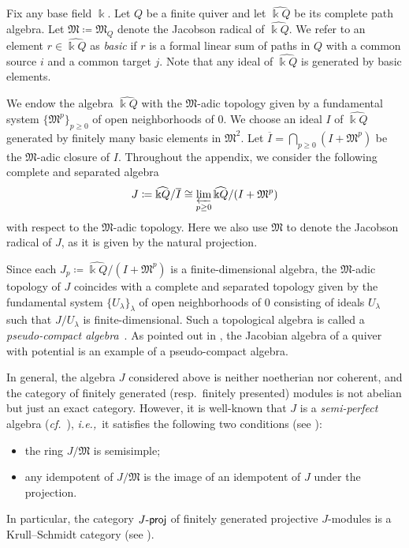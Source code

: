 \documentclass[12pt]{amsart}
\theoremstyle{definition}
\theoremstyle{remark}
\numberwithin{equation}{section}
\newcommand{\ie}{\textit{i.e.,}\ }
\newcommand{\confer}{\textit{cf.}\ }
\newcommand{\projc}{\mathchar`-\mathsf{proj}}
\newcommand{\fM}{\mathfrak{M}}
\begin{document}
Fix any base field $\Bbbk $. Let $Q$ be a finite quiver and let $\widehat{ \Bbbk  Q}$ be its complete path algebra. Let $\fM \coloneqq \mathfrak{M}_Q$ denote the Jacobson radical of $\widehat{ \Bbbk  Q}$.
We refer to an element $r\in \widehat{ \Bbbk  Q}$ as \emph{basic} if $r$ is a formal linear sum of paths in $Q$ with a common source $i$ and a common target $j$. Note that any ideal of $\widehat{ \Bbbk  Q}$ is generated by basic elements.

We endow the algebra $\widehat{ \Bbbk  Q}$ with the $\mathfrak{M}$-adic topology given by a fundamental system $\{\mathfrak{M}^p\}_{p\geq 0}$ of open neighborhoods of $0$.
We choose an ideal $I$ of $\widehat{ \Bbbk  Q}$ generated by finitely many basic elements in $\mathfrak{M}^2$.  Let $\overline I= \bigcap_{p\geq 0}(I+\mathfrak{M}^p)$ be the $\mathfrak{M}$-adic closure of $I$. Throughout the appendix, we consider the following complete and separated algebra \[J \coloneqq \widehat{\Bbbk  Q}/\overline I \cong \varprojlim_{p\geq 0} \widehat{\Bbbk  Q}/ (I + \fM^p)\] with respect to the $\fM$-adic topology. Here we also use $\fM$ to denote the Jacobson radical of $J$, as it is given by the natural projection.

Since each $J_p \coloneqq \widehat{\Bbbk  Q}/ (I + \fM^p)$ is a finite-dimensional algebra, the $\fM$-adic topology of $J$ coincides with a complete and separated topology given by the fundamental system $\{U_\lambda\}_{\lambda}$ of open neighborhoods of $0$ consisting of ideals $U_\lambda$ such that $J/U_\lambda$ is finite-dimensional. Such a topological algebra is called a {\em pseudo-compact algebra}~\cite{Gab62}. As pointed out in \cite[\S 7]{Keller-Yang_2011}, the Jacobian algebra of a quiver with potential is an example of a pseudo-compact algebra.

In general, the algebra $J$ considered above is neither noetherian nor coherent, and the category of finitely generated (resp.\ finitely presented) modules is not abelian but just an exact category. However, it is well-known that $J$ is a \emph{semi-perfect} algebra (\confer \cite[Lemma~4.3]{KM22}), \ie it satisfies the following two conditions (see \cite[\S 27]{AF92}): 
\begin{itemize}
\item the ring $J/\fM$ is semisimple; \item any idempotent of $J/\fM$ is the image of an idempotent of $J$ under the projection. 
\end{itemize}
In particular, the category $J\projc$ of finitely generated projective $J$-modules is a Krull--Schmidt category (see \cite[Proposition~4.1]{Kra15}).
\end{document}
